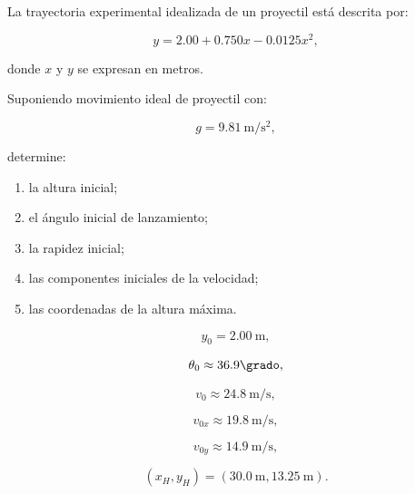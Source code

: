 \begin{ejercicio}
La trayectoria experimental idealizada de un proyectil está descrita por:

\[
y
=
2.00
+
0.750x
-
0.0125x^2,
\]

donde \(x\) y \(y\) se expresan en metros.

Suponiendo movimiento ideal de proyectil con:

\[
g=\SI{9.81}{\meter\per\second\squared},
\]

determine:

\begin{enumerate}[label=\alph*)]
    \item la altura inicial;
    \item el ángulo inicial de lanzamiento;
    \item la rapidez inicial;
    \item las componentes iniciales de la velocidad;
    \item las coordenadas de la altura máxima.
\end{enumerate}
\end{ejercicio}

\begin{respuesta}
\[
y_0=\SI{2.00}{\meter},
\]

\[
\theta_0\approx36.9\grado,
\]

\[
v_0\approx\SI{24.8}{\meter\per\second},
\]

\[
v_{0x}\approx\SI{19.8}{\meter\per\second},
\]

\[
v_{0y}\approx\SI{14.9}{\meter\per\second},
\]

\[
\boxed{
(x_H,y_H)
=
(\SI{30.0}{\meter},\SI{13.25}{\meter})
}.
\]
\end{respuesta}

